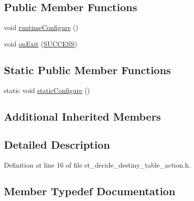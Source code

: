 \subsection*{Public Member Functions}
\begin{DoxyCompactItemize}
\item 
void \hyperlink{structsm__moveit__wine__serve_1_1StDecideDestinyTableAction_a56880d6b1c963d4545287559efa3c111}{runtime\+Configure} ()
\item 
void \hyperlink{structsm__moveit__wine__serve_1_1StDecideDestinyTableAction_a191974c827cd510d432c5529b333d9da}{on\+Exit} (\hyperlink{structsmacc_1_1default__transition__tags_1_1SUCCESS}{S\+U\+C\+C\+E\+SS})
\end{DoxyCompactItemize}
\subsection*{Static Public Member Functions}
\begin{DoxyCompactItemize}
\item 
static void \hyperlink{structsm__moveit__wine__serve_1_1StDecideDestinyTableAction_a2b79a2a3bc8186e65f5bf011f85ed886}{static\+Configure} ()
\end{DoxyCompactItemize}
\subsection*{Additional Inherited Members}


\subsection{Detailed Description}


Definition at line 16 of file st\+\_\+decide\+\_\+destiny\+\_\+table\+\_\+action.\+h.



\subsection{Member Typedef Documentation}
\mbox{\label{structsm__moveit__wine__serve_1_1StDecideDestinyTableAction_a1b9c9f81508614c86da1ee78225b2029}} 
